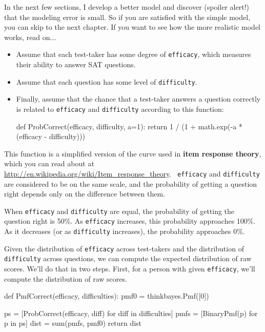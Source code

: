 \documentclass[12pt]{book}
\theoremstyle{exercise}
\newcommand{\py}[1]{{\tt #1}}%
\begin{document}
In the next few sections, I develop a better model and
discover (spoiler alert!) that the modeling error is small.  So if
you are satisfied with the simple model, you can skip to the next
chapter.  If you want to see how the more realistic model works,
read on...

\begin{itemize}

\item Assume that each test-taker has some
  degree of \py{efficacy}, which measures their
  ability to answer SAT questions.

\item Assume that each question has some level of
  \py{difficulty}.

\item Finally, assume that the chance that a test-taker answers a
  question correctly is related to \py{efficacy} and \py{difficulty}
  according to this function:

\begin{code}
def ProbCorrect(efficacy, difficulty, a=1):
    return 1 / (1 + math.exp(-a * (efficacy - difficulty)))
\end{code}

\end{itemize}

This function is a simplified version of the curve used in {\bf item
response theory}, which you can read about at
\url{http://en.wikipedia.org/wiki/Item_response_theory}.  {\tt
  efficacy} and \py{difficulty} are considered to be on the same
scale, and the probability of getting a question right depends only on
the difference between them.

When \py{efficacy} and \py{difficulty} are equal, the
probability of getting the question right is 50\%.  As
\py{efficacy} increases, this probability approaches 100\%.
As it decreases (or as \py{difficulty} increases), the
probability approaches 0\%.

Given the distribution of \py{efficacy} across test-takers
and the distribution of \py{difficulty} across questions, we
can compute the expected distribution of raw scores.  We'll do that
in two steps.  First, for a person with given \py{efficacy},
we'll compute the distribution of raw scores.

\begin{code}
def PmfCorrect(efficacy, difficulties):
    pmf0 = thinkbayes.Pmf([0])

    ps = [ProbCorrect(efficacy, diff) for diff in difficulties]
    pmfs = [BinaryPmf(p) for p in ps]
    dist = sum(pmfs, pmf0)
    return dist
\end{code}
\end{document}
